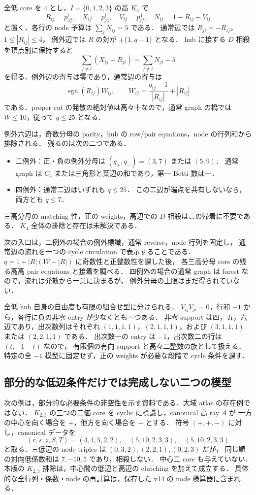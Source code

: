 全低 core を $4$ とし，$I=\{0,1,2,3\}$ の高 $K_4$ で
\[
 R_{ij}=p^i_{4j},\quad X_{ij}=p^i_{j4},\quad V_{ij}=p^4_{ij},
 \quad N_{ij}=1-R_{ij}-V_{ij}
\]
と置く．各行の node 予算は $\sum_jN_{ij}=5$ である．
通常辺では $R_{ji}=-R_{ij}$，$1\le|R_{ij}|\le4$，
例外辺では $R$ の対が $\pm\{1,q-1\}$ となる．
hub に接する $D$ 相殺を頂点別に保持すると
\[
 \sum_{j\ne i}(X_{ij}-R_{ji})
 =\sum_{j\ne i}N_{ji}-5
\]
を得る．例外辺の寄与は零であり，通常辺の寄与は
\[
 \operatorname{sgn}(R_{ij})W_{ij},\qquad
 W_{ij}=\frac{q_{ij}-1}{|R_{ij}|}+|R_{ij}|
\]
である．proper cut の発散の絶対値は高々十なので，通常 graph の橋では
$W\le10$，従って $q\le25$ となる．

例外六辺は，奇数分母の parity，hub の row/pair equations，node の行列和から排除される．
残るのは次の二つである．
\begin{itemize}
\item 二例外：正・負の例外分母は $(q_+,q_-)=(3,7)$ または $(5,9)$．
通常 graph は $C_4$ または三角形と葉辺の和であり，第一 Betti 数は一．
\item 四例外：通常二辺はいずれも $q\le25$．
この二辺が端点を共有しないなら，両方とも $q\le7$．
\end{itemize}
三高分母の matching 性，正の weights，高辺での $D$ 相殺はこの帰着に不要である．
$K_4$ 全体の排除と存在は未解決である．

次の入口は，二例外の場合の例外標識，通常 reverse，node 行列を固定し，
通常辺の流れを一つの cycle circulation で表示することである．
$q=1+|R|(W-|R|)$ に奇数性と正整数性を課した後，
各三高分母 core の残る高高 pair equations と接着を調べる．
四例外の場合の通常 graph は forest なので，流れは発散から一意に決まるが，
例外分母の上限はまだ得られていない．

全低 hub 自身の自由度も有限の組合せ型に分けられる．
$V_{ij}V_{ji}=0$，行和 $-1$ から，各行に負の非零 entry が少なくとも一つある．
非零 support は四，五，六辺であり，出次数列はそれぞれ
$(1,1,1,1)$，$(2,1,1,1)$，および $(3,1,1,1)$ または $(2,2,1,1)$ である．
出次数一の entry は $-1$，出次数二の行は $(t,-1-t)$ なので，
有限個の有向 support と高々二整数の族として扱える．
特定の全 $-1$ 模型に固定せず，正の weights が必要な段階で cycle 条件を課す．
\subsection{部分的な低辺条件だけでは完成しない二つの模型}
\label{ng16:partial-patches}

次の例は，部分的な必要条件の非空性を示す資料である．大域 atlas の存在例ではない．
$K_{2,3}$ の三つの二価 core を cyclic に標識し，canonical 高 ray $A$ が
一方の中心を向く場合を $+$，他方を向く場合を $-$ とする．
符号 $(+,+,-)$ に対し，canonical データを
\[
 (r,s,z,S,T)=(4,4,5,2,2),\quad(5,10,2,3,3),\quad(5,10,2,3,3)
\]
と取る．三低辺の node triples は $(0,3,2),(2,2,1),(0,2,3)$ だが，
同じ順の対向低係数和は $7,-10,5$ であり，相殺しない．
中心二 core も与えていない．本版の $K_{2,3}$ 排除は，中心間の低辺と高辺の clutching を加えて成立する．
具体的な全行列・係数・node の再計算は，保存した v14 の node 検算器に含まれる．

